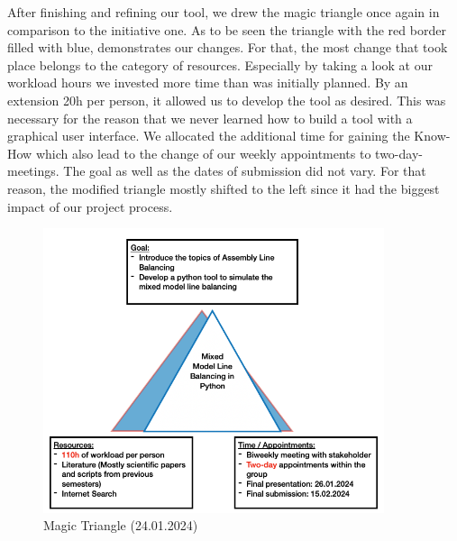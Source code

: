 After finishing and refining our tool, we drew the magic triangle once again in comparison to the initiative one. As to be seen the triangle with the red border filled with blue, demonstrates our changes. For that, the most change that took place belongs to the category of resources. Especially by taking a look at our workload hours we invested more time than was initially planned. By an extension 20h per person, it allowed us to develop the tool as desired. This was necessary for the reason that we never learned how to build a tool with a graphical user interface. We allocated the additional time for gaining the Know-How which also lead to the change of our weekly appointments to two-day-meetings. The goal as well as the dates of submission did not vary. For that reason, the modified triangle mostly shifted to the left since it had the biggest impact of our project process.
\begin{figure}[H]
\centering
\includegraphics[width=10cm]{Abbildungen/Magic_Triangle_end.png}
\vspace{-0.4cm}
\caption{Magic Triangle (24.01.2024)}
\label{fig:Magic_Triangle_end}
\end{figure}
